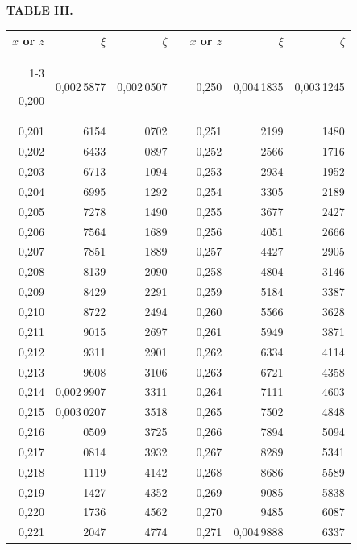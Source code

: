 \endgroup
\clearpage
{}
\begingroup
\centering
\fontsize{9}{9}\selectfont
\setlength{\tabcolsep}{8pt}
\renewcommand{\arraystretch}{1}
\setlength{\parskip}{0pt}
\textbf{TABLE III.}
\par\vspace{7pt}
\begin{tabular}{|r|r|r|@{}p{9pt}@{}|r|r|r|}
\hline
\rule{0pt}{8.5pt}\(x\) or \(z\) & \(\xi\) & \(\zeta\) & & \(x\) or \(z\) & \(\xi\) & \(\zeta\) \\
\cline{1-3}\cline{5-7}
\rule{0pt}{8.5pt}0,200 & 0,002\,5877 & 0,002\,0507 &  & 0,250 & 0,004\,1835 & 0,003\,1245 \\
0,201 & 6154 & 0702 &  & 0,251 & 2199 & 1480 \\
0,202 & 6433 & 0897 &  & 0,252 & 2566 & 1716 \\
0,203 & 6713 & 1094 &  & 0,253 & 2934 & 1952 \\
0,204 & 6995 & 1292 &  & 0,254 & 3305 & \llap{\raisebox{1.6ex}{.}\hspace{.1em}}2189 \\
0,205 & 7278 & 1490 &  & 0,255 & 3677 & 2427 \\[3pt]
0,206 & 7564 & 1689 &  & 0,256 & 4051 & 2666 \\
0,207 & 7851 & 1889 &  & 0,257 & 4427 & 2905 \\
0,208 & 8139 & 2090 &  & 0,258 & 4804 & 3146 \\
0,209 & 8429 & 2291 &  & 0,259 & 5184 & 3387 \\
0,210 & 8722 & 2494 &  & 0,260 & 5566 & 3628 \\[3pt]
0,211 & 9015 & 2697 &  & 0,261 & 5949 & 3871 \\
0,212 & 9311 & 2901 &  & 0,262 & 6334 & 4114 \\
0,213 & 9608 & 3106 &  & 0,263 & 6721 & 4358 \\
0,214 & 0,002\,9907 & 3311 &  & 0,264 & 7111 & 4603 \\
0,215 & 0,003\,0207 & 3518 &  & 0,265 & 7502 & 4848 \\[3pt]
0,216 & 0509 & 3725 &  & 0,266 & 7894 & 5094 \\
0,217 & 0814 & 3932 &  & 0,267 & 8289 & 5341 \\
0,218 & 1119 & 4142 &  & 0,268 & 8686 & 5589 \\
0,219 & 1427 & 4352 &  & 0,269 & 9085 & 5838 \\
0,220 & 1736 & 4562 &  & 0,270 & 9485 & 6087 \\[3pt]
0,221 & 2047 & 4774 &  & 0,271 & 0,004\,9888 & 6337 \\

\end{tabular}
